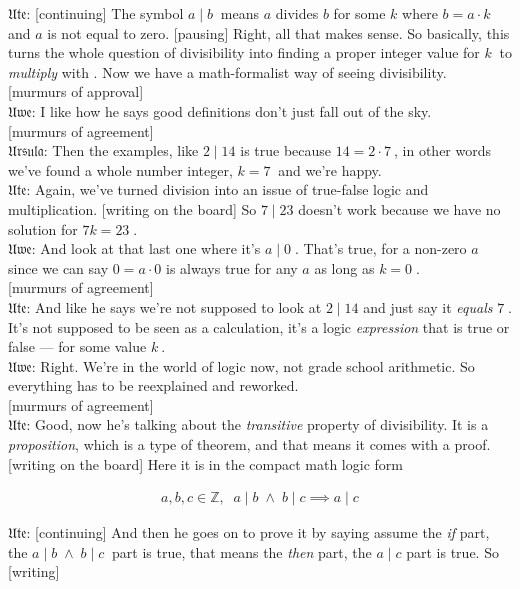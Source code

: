 \documentclass[american]{article}
\begin{document}
𝔘𝔱𝔢: [continuing] The
symbol \(a \mid b\:\) means \(a\) divides \(b\) for some \(k\) where \(b = a \cdot
k\;\) and \(a\) is not equal to zero. [pausing] Right, all that makes
sense. So basically, this turns the whole question of divisibility
into finding a proper integer value for \(k\:\) to \emph{multiply} with . Now
we have a math-formalist way of seeing divisibility. \\[0pt]
[murmurs of approval] \\[0pt]
𝔘𝔴𝔢: I like how he says
good definitions don't just fall out of the sky. \\[0pt]
[murmurs of agreement] \\[0pt]
𝔘𝔯𝔰𝔲𝔩𝔞: Then the
examples, like \(2 \mid 14\) is true because \(14 = 2 \cdot 7\:\), in other
words we've found a whole number integer, \(k = 7\:\) and we're
happy. \\[0pt]
𝔘𝔱𝔢: Again, we've
turned division into an issue of true-false logic and
multiplication. [writing on the board] So \(7 \mid 23\) doesn't work
because we have no solution for \(7k = 23\;\). \\[0pt]
𝔘𝔴𝔢: And look at that
last one where it's \(a \mid 0\;\). That's true, for a non-zero \(a\)
since we can say \(0 = a \cdot 0\) is always true for any \(a\) as long as \(k
= 0\;\). \\[0pt]
[murmurs of agreement] \\[0pt]
𝔘𝔱𝔢: And like he says
we're not supposed to look at \(2 \mid 14\) and just say it \emph{equals}
\(7\;\). It's not supposed to be seen as a calculation, it's a logic
\emph{expression} that is true or false --- for some value \(k\:\). \\[0pt]
𝔘𝔴𝔢: Right. We're in
the world of logic now, not grade school arithmetic. So everything has
to be reexplained and reworked. \\[0pt]
[murmurs of agreement] \\[0pt]
𝔘𝔱𝔢: Good, now he's
talking about the \emph{transitive} property of divisibility. It is a
\emph{proposition}, which is a type of theorem, and that means it comes
with a proof. [writing on the board] Here it is in the compact math
logic form

\begin{align*}
a, b, c \in \mathbb{Z},\;\; a \mid b \;\land\; b \mid c \implies a \mid c
\end{align*}

𝔘𝔱𝔢: [continuing] And
then he goes on to prove it by saying assume the \emph{if} part, the \(a
\mid b \;\land\; b \mid c\:\) part is true, that means the \emph{then} part, the
\(a \mid c\) part is true. So [writing]
\end{document}
